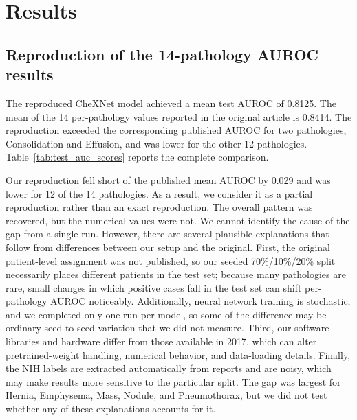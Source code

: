 \section{Results}

\subsection{Reproduction of the 14-pathology AUROC results}

The reproduced CheXNet model achieved a mean test AUROC of 0.8125. The mean of
the 14 per-pathology values reported in the original article is 0.8414. The
reproduction exceeded the corresponding published AUROC for two pathologies,
Consolidation and Effusion, and was lower for the other 12 pathologies.
Table~\ref{tab:test_auc_scores} reports the complete comparison.

Our reproduction fell short of the published mean AUROC by 0.029 and was
lower for 12 of the 14 pathologies. As a result, we consider it as a partial reproduction
rather than an exact reproduction. The overall pattern was recovered, but the
numerical values were not. We cannot identify the cause of the gap from a
single run. However, there are several plausible explanations that follow from differences
between our setup and the original. First, the original patient-level
assignment was not published, so our seeded 70\%/10\%/20\% split
necessarily places different patients in the test set; because many
pathologies are rare, small changes in which positive cases fall in the
test set can shift per-pathology AUROC noticeably. Additionally, neural network
training is stochastic, and we completed only one run per model, so some
of the difference may be ordinary seed-to-seed variation that we did not
measure. Third, our software libraries and hardware differ from those
available in 2017, which can alter pretrained-weight handling, numerical
behavior, and data-loading details. Finally, the NIH labels are extracted
automatically from reports and are noisy, which may make results more
sensitive to the particular split. The gap was largest for Hernia,
Emphysema, Mass, Nodule, and Pneumothorax, but we did not test whether any
of these explanations accounts for it.

